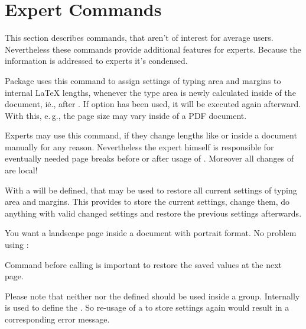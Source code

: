 \section{Expert Commands}
\label{sec:typearea-experts.experts}

This section describes commands, that aren't of interest for average
users. Nevertheless these commands provide additional features for
experts. Because the information is addressed to experts it's condensed.

\begin{Declaration}
\end{Declaration}%
%
Package  uses this command to assign settings of typing area
and margins to internal \LaTeX{} lengths, whenever the type area is newly
calculated inside of the document, i\.e., after
. If option  has been used,
it will be executed again afterward. With this, e.\,g., the page size may vary
inside of a PDF document.

Experts may use this command, if they change lengths like 
or  inside a document manually for any reason. Nevertheless
the expert himself is responsible for eventually needed page breaks before or
after usage of . Moreover all changes of
 are local!%
% 

\begin{Declaration}
\end{Declaration}
%
With  a  will be defined, that may be
used to restore all current settings of typing area and margins. This provides
to store the current settings, change them, do anything with valid changed
settings and restore the previous settings afterwards.

\begin{Example}
  You want a landscape page inside a document with portrait format. No problem
  using :
  Command  before calling
   is important to restore the saved values at the next
  page.
\end{Example}
Please note that neither  nor the
defined  should be used inside a group. Internally
 is
used to define the . So re-usage of a
 to store settings again would result in a
corresponding error message.
%

